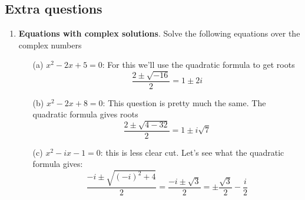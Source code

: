 \documentclass[11pt,a4paper]{scrartcl}
\begin{document}
\subsection*{Extra questions}

\begin{enumerate}
\item \textbf{Equations with complex solutions}. Solve the following equations over the complex numbers
  \begin{itemize}
  \item[(a)] $x^2 - 2x + 5 = 0$: For this we'll use the quadratic formula to get roots
  \[
  \frac{2\pm \sqrt{-16}}{2} = 1\pm 2i
  \]
  \item[(b)] $x^2-2x + 8 = 0$:
  This question is pretty much the same. The quadratic formula gives
  roots \[
  \frac{2\pm \sqrt{4-32}}{2} = 1\pm i\sqrt{7}
  \]
  \item[(c)] $x^2 - ix - 1 = 0$: this is less clear cut. Let's see what the quadratic formula gives:
  \[
  \frac{-i \pm \sqrt{(-i)^2 +4} }{2} 
  =   \frac{-i \pm \sqrt{3} }{2} 
  =   \pm \frac{\sqrt{3}}{2} -\frac{i}{2}
  \]
  \end{itemize}

\end{enumerate}
\end{document}
